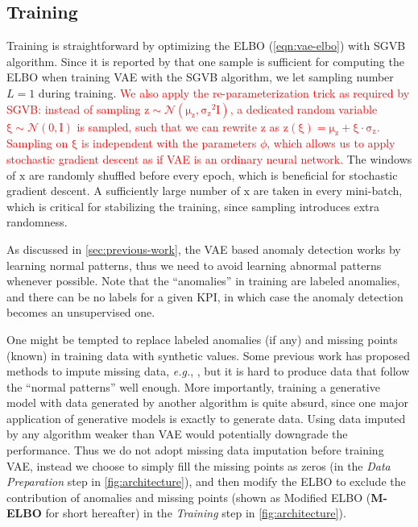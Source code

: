 \documentclass[sigconf]{acmart}
\newcommand\compactdel[1]{{\textcolor{red}{#1}}}
\newcommand\compactdel[1]{}
\newcommand\compactvspace[1]{\vspace{#1}}
\newcommand\compactdel[1]{#1}
\newcommand\compactvspace[1]{}
\newcommand{\EG}{\textit{e.g.}}
\newcommand{\vv}[1]{\bm{\mathrm{{#1}}}}
\begin{document}

\compactvspace{-1em}
\subsection{Training}
\label{sec:training}

Training is straightforward by optimizing the ELBO (\cref{eqn:vae-elbo}) with SGVB~\cite{kingma_auto-encoding_2014} algorithm.
Since it is reported by \cite{kingma_auto-encoding_2014} that one sample is sufficient for computing the ELBO when training VAE with the SGVB algorithm, we let sampling number $L=1$ during training.
\compactdel{We also apply the re-parameterization trick as required by SGVB: instead of sampling $\vv{z} \sim \mathcal{N}(\vv{\mu_z}, \vv{\sigma_z}^2 \vv{I})$, a dedicated random variable $\vv{\xi} \sim \mathcal{N}(\vv{0},\vv{I})$ is sampled, such that we can rewrite $\vv{z}$ as $\vv{z}(\vv{\xi}) = \vv{\mu_z} + \vv{\xi} \cdot \vv{\sigma_z}$.
Sampling on $\vv{\xi}$ is independent with the parameters $\phi$, which allows us to apply stochastic gradient descent as if VAE is an ordinary neural network.}
The windows of $\vv{x}$ are randomly shuffled before every epoch, which is beneficial for stochastic gradient descent.
A sufficiently large number of $\vv{x}$ are taken in every mini-batch, which is critical for stabilizing the training, since sampling introduces extra randomness.

As discussed in \cref{sec:previous-work}, the VAE based anomaly detection works by learning normal patterns, thus we need to avoid learning abnormal patterns whenever possible. Note that the ``anomalies'' in training are labeled anomalies, and there can be no labels for a given KPI, in which case the anomaly detection becomes an unsupervised one.

One might be tempted to replace labeled anomalies (if any)
 and missing points (known) in training data with synthetic values. Some previous work has proposed methods to impute missing data, \EG, \cite{missing}, but it is hard to produce data that follow the ``normal patterns'' well enough. More importantly, training a generative model with data generated by another algorithm is quite absurd, since one major application of generative models is exactly to generate data.
Using data imputed by any algorithm weaker than VAE would potentially downgrade the performance.
Thus we do not adopt missing data imputation before training VAE, instead we choose to simply fill the missing points as zeros (in the \textit{Data Preparation} step in \cref{fig:architecture}), and then modify the ELBO to exclude the contribution of anomalies and missing points (shown as Modified ELBO (\textbf{M-ELBO} for short hereafter) in the \textit{Training} step in \cref{fig:architecture}).
\end{document}
